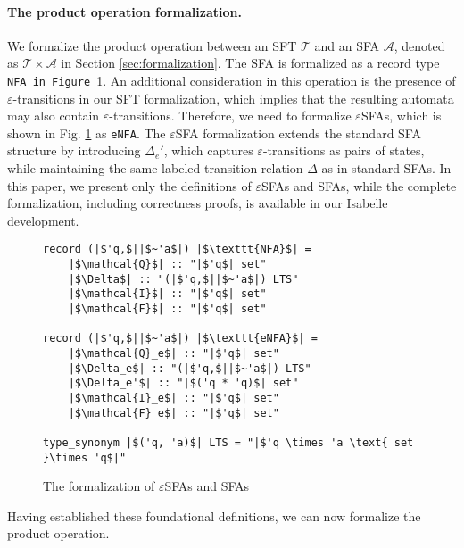 \paragraph{The product operation formalization.} We formalize the product operation between an SFT $\mathcal{T}$ and an SFA $\mathcal{A}$, denoted as $\mathcal{T} \times \mathcal{A}$ in Section \ref{sec:formalization}. The SFA is formalized as a record type \texttt{NFA in Figure \ref{fig-def-FAs}}.
An additional consideration in this operation is the presence of $\varepsilon$-transitions in our SFT formalization, which implies that the resulting automata may also contain $\varepsilon$-transitions.
%
Therefore, we need to formalize $\varepsilon$SFAs, which is shown in Fig. \ref{fig-def-FAs} as \texttt{eNFA}. The $\varepsilon$SFA formalization extends the standard SFA structure by introducing $\Delta_e'$, which captures $\varepsilon$-transitions as pairs of states, while maintaining the same labeled transition relation $\Delta$ as in standard SFAs.
In this paper, we present only the definitions of  $\varepsilon$SFAs and SFAs, while the complete formalization, including correctness proofs, is available in our Isabelle development.

\begin{figure}[hbt!]
	\begin{lstlisting}
record (|$'q,$||$~'a$|) |$\texttt{NFA}$| =
	|$\mathcal{Q}$| :: "|$'q$| set"
	|$\Delta$| :: "(|$'q,$||$~'a$|) LTS"
	|$\mathcal{I}$| :: "|$'q$| set"
	|$\mathcal{F}$| :: "|$'q$| set"

record (|$'q,$||$~'a$|) |$\texttt{eNFA}$| =
	|$\mathcal{Q}_e$| :: "|$'q$| set"
	|$\Delta_e$| :: "(|$'q,$||$~'a$|) LTS"
	|$\Delta_e'$| :: "|$('q * 'q)$| set"
	|$\mathcal{I}_e$| :: "|$'q$| set"
	|$\mathcal{F}_e$| :: "|$'q$| set"

type_synonym |$('q, 'a)$| LTS = "|$'q \times 'a \text{ set }\times 'q$|"    
	\end{lstlisting}
\caption{The formalization of $\varepsilon$SFAs and SFAs}
\label{fig-def-FAs}
\end{figure}


Having established these foundational definitions, we can now formalize the product operation. 

